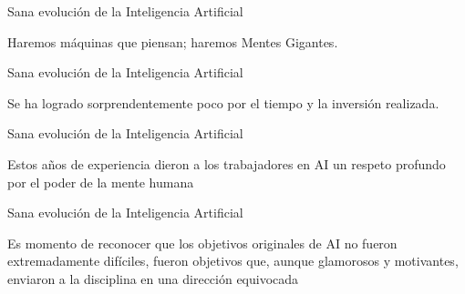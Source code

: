 \documentclass{beamer}
\begin{document}
\begin{frame}{Sana evolución de la Inteligencia Artificial}
\begin{center}
Haremos máquinas que piensan; haremos Mentes Gigantes.
\end{center}
\end{frame}
\begin{frame}{Sana evolución de la Inteligencia Artificial}
\begin{center}
Se ha logrado sorprendentemente poco por el tiempo y la inversión realizada.
\end{center}
\end{frame}
\begin{frame}{Sana evolución de la Inteligencia Artificial}
\begin{center}
Estos años de experiencia dieron a los trabajadores en AI 
un respeto profundo por el poder de la mente humana
\end{center}
\end{frame}
\begin{frame}{Sana evolución de la Inteligencia Artificial}
\begin{center}
Es momento de reconocer que los objetivos originales de AI 
no fueron extremadamente difíciles,
fueron objetivos que, aunque glamorosos y motivantes, 
enviaron a la disciplina en una dirección equivocada
\end{center}
\end{frame}
\end{document}
